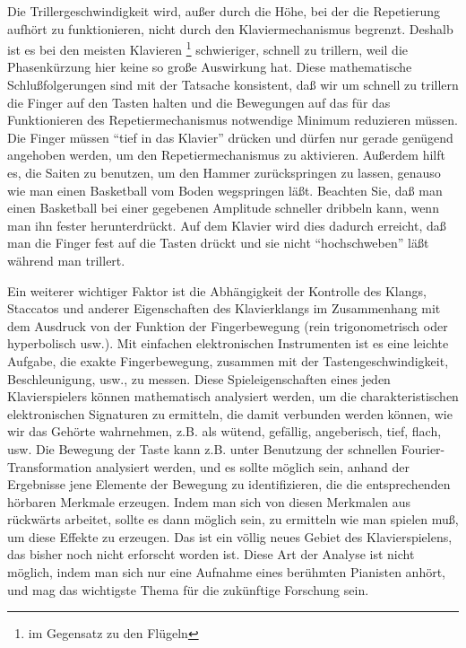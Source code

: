 Die Trillergeschwindigkeit wird, außer durch die Höhe, bei der die Repetierung aufhört zu funktionieren, nicht durch den Klaviermechanismus begrenzt.
Deshalb ist es bei den meisten Klavieren \footnote{im Gegensatz zu den Flügeln} schwieriger, schnell zu trillern, weil die Phasenkürzung hier keine so große Auswirkung hat.
Diese mathematische Schlußfolgerungen sind mit der Tatsache konsistent, daß wir um schnell zu trillern die Finger auf den Tasten halten und die Bewegungen auf das für das Funktionieren des Repetiermechanismus notwendige Minimum reduzieren müssen.
Die Finger müssen \enquote{tief in das Klavier} drücken und dürfen nur gerade genügend angehoben werden, um den Repetiermechanismus zu aktivieren.
Außerdem hilft es, die Saiten zu benutzen, um den Hammer zurückspringen zu lassen, genauso wie man einen Basketball vom Boden wegspringen läßt.
Beachten Sie, daß man einen Basketball bei einer gegebenen Amplitude schneller dribbeln kann, wenn man ihn fester herunterdrückt.
Auf dem Klavier wird dies dadurch erreicht, daß man die Finger fest auf die Tasten drückt und sie nicht \enquote{hochschweben} läßt während man trillert.

Ein weiterer wichtiger Faktor ist die Abhängigkeit der Kontrolle des Klangs, Staccatos und anderer Eigenschaften des Klavierklangs im Zusammenhang mit dem Ausdruck von der Funktion der Fingerbewegung (rein trigonometrisch oder hyperbolisch usw.).
Mit einfachen elektronischen Instrumenten ist es eine leichte Aufgabe, die exakte Fingerbewegung, zusammen mit der Tastengeschwindigkeit, Beschleunigung, usw., zu messen.
Diese Spieleigenschaften eines jeden Klavierspielers können mathematisch analysiert werden, um die charakteristischen elektronischen Signaturen zu ermitteln, die damit verbunden werden können, wie wir das Gehörte wahrnehmen, z.B. als wütend, gefällig, angeberisch, tief, flach, usw.
Die Bewegung der Taste kann z.B. unter Benutzung der schnellen Fourier-Transformation analysiert werden, und es sollte möglich sein, anhand der Ergebnisse jene Elemente der Bewegung zu identifizieren, die die entsprechenden hörbaren Merkmale erzeugen.
Indem man sich von diesen Merkmalen aus rückwärts arbeitet, sollte es dann möglich sein, zu ermitteln wie man spielen muß, um diese Effekte zu erzeugen.
Das ist ein völlig neues Gebiet des Klavierspielens, das bisher noch nicht erforscht worden ist.
Diese Art der Analyse ist nicht möglich, indem man sich nur eine Aufnahme eines berühmten Pianisten anhört, und mag das wichtigste Thema für die zukünftige Forschung sein.



